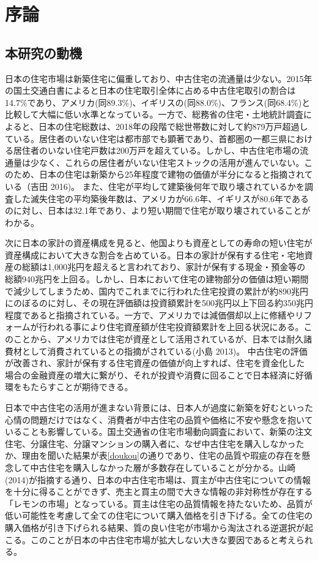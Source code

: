 \documentclass[a4paper,fontsize=11pt,report,notitlepage,line_length=38zw,number_of_lines=40,dvipdfmx]{jlreq}
\begin{document}
\newpage
\tableofcontents

\newpage
\chapter{序論}
\section{本研究の動機}
日本の住宅市場は新築住宅に偏重しており、中古住宅の流通量は少ない。2015年の国土交通白書によると日本の住宅取引全体に占める中古住宅取引の割合は14.7\%であり、アメリカ(同89.3\%)、イギリスの(同88.0\%)、フランス(同68.4\%)と比較して大幅に低い水準となっている\cite{hakusho}。一方で、総務省の住宅・土地統計調査によると、日本の住宅総数は、2018年の段階で総世帯数に対して約879万戸超過している。居住者のいない住宅は都市部でも顕著であり、首都圏の一都三県における居住者のいない住宅戸数は200万戸を超えている。しかし、中古住宅市場の流通量は少なく、これらの居住者がいない住宅ストックの活用が進んでいない。このため、日本の住宅は新築から25年程度で建物の価値が半分になると指摘されている（吉田 2016)\cite{yoshida2016}。
また、住宅が平均して建築後何年で取り壊されているかを調査した滅失住宅の平均築後年数は、アメリカが66.6年、イギリスが80.6年であるのに対し、日本は32.1年であり、より短い期間で住宅が取り壊されていることがわかる\cite{kizonjutaku}。

次に日本の家計の資産構成を見ると、他国よりも資産としての寿命の短い住宅が資産構成において大きな割合を占めている。日本の家計が保有する住宅・宅地資産の総額は1,000兆円を超えると言われており、家計が保有する現金・預金等の総額940兆円を上回る。しかし、日本において住宅の建物部分の価値は短い期間で減少してしまうため、国内でこれまでに行われた住宅投資の累計が約890兆円にのぼるのに対し、その現在評価額は投資額累計を500兆円以上下回る約350兆円程度であると指摘されている\cite{roundtable}。一方で、アメリカでは減価償却以上に修繕やリフォームが行われる事により住宅資産額が住宅投資額累計を上回る状況にある。このことから、アメリカでは住宅が資産として活用されているが、日本では耐久諸費材として消費されているとの指摘がされている(小島 2013)\cite{kojima2013}。
中古住宅の評価が改善され、家計が保有する住宅資産の価値が向上すれば、住宅を資金化した場合の金融資産の増大に繋がり、それが投資や消費に回ることで日本経済に好循環をもたらすことが期待できる。

日本で中古住宅の活用が進まない背景には、日本人が過度に新築を好むといった心情の問題だけではなく、消費者が中古住宅の品質や価格に不安や懸念を抱いていることも影響している。国土交通省の住宅市場動向調査において、新築の注文住宅、分譲住宅、分譲マンションの購入者に、なぜ中古住宅を購入しなかったか、理由を聞いた結果が表\ref{doukou}の通りであり、住宅の品質や瑕疵の存在を懸念して中古住宅を購入しなかった層が多数存在していることが分かる。山崎(2014)\cite{yamasaki2014}が指摘する通り、日本の中古住宅市場は、買主が中古住宅についての情報を十分に得ることができず、売主と買主の間で大きな情報の非対称性が存在する「レモンの市場」となっている。買主は住宅の品質情報を持たないため、品質が低い可能性を考慮して全ての住宅について購入価格を引き下げる。全ての住宅の購入価格が引き下げられる結果、質の良い住宅が市場から淘汰される逆選択が起こる。このことが日本の中古住宅市場が拡大しない大きな要因であると考えられる。
\end{document}
